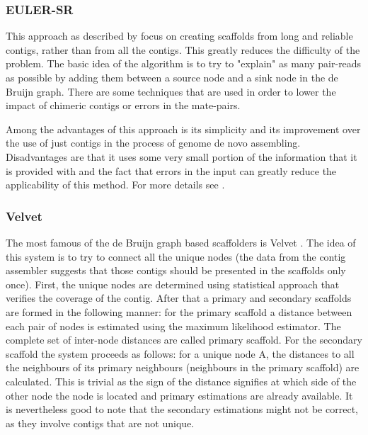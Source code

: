 \documentclass[11pt]{article}
\begin{document}
\subsubsection{EULER-SR} %
\label{ssub:EULER-SR}
This approach as described by \cite{pevzner} focus on creating scaffolds from
long and reliable contigs, rather than from all the contigs. This greatly
reduces the difficulty of the problem. The basic idea of the algorithm is to try
to "explain" as many pair-reads as possible by adding them between a source node
and a sink node in the de Bruijn graph. There are some techniques that are used
in order to lower the impact of chimeric contigs or errors in the mate-pairs.

Among the advantages of this approach is its simplicity and its improvement over
the use of just contigs in the process of genome de novo assembling.
Disadvantages are that it uses some very small portion of the information that
it is provided with and the fact that errors in the input can greatly reduce the
applicability of this method. For more details see \cite{pevzner}.


\subsubsection{Velvet} %
\label{ssub:Velvet}
The most famous of the de Bruijn graph based scaffolders is Velvet
\cite{velvet-scaffolding}. The idea of this system is to try to connect all the
unique nodes (the data from the contig assembler suggests that those contigs
should be presented in the scaffolds only once). First, the unique nodes are
determined using statistical approach that verifies the coverage of the contig.
After that a primary and secondary scaffolds are formed in the following manner:
for the primary scaffold a distance between each pair of nodes is estimated
using the maximum likelihood estimator. The complete set of inter-node distances
are called primary scaffold. For the secondary scaffold the system proceeds as
follows: for a unique node A, the distances to all the neighbours of its primary
neighbours (neighbours in the primary scaffold) are calculated. This is trivial
as the sign of the distance signifies at which side of the other node the node
is located and primary estimations are already available. It is nevertheless
good to note that the secondary estimations might not be correct, as they
involve contigs that are not unique.
\end{document}
